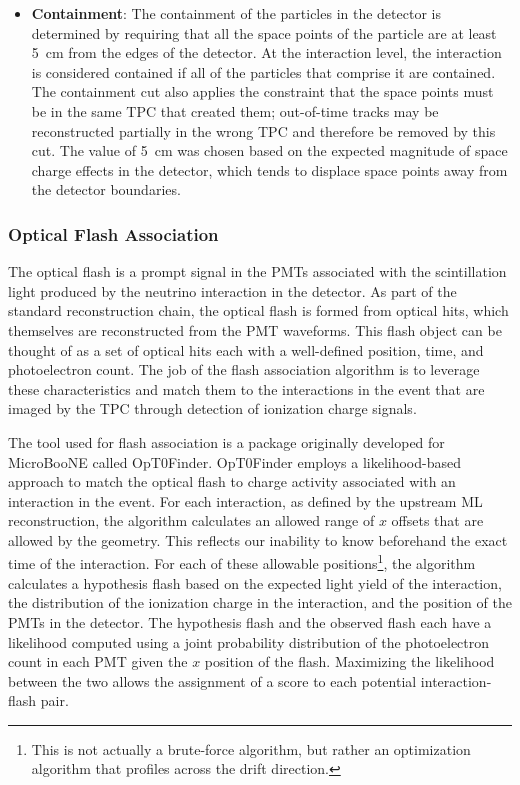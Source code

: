 \begin{itemize}
    \item \textbf{Containment}: The containment of the particles in the detector is determined by requiring that all the space points of the particle are at least \qty[mode=text]{5}{cm} from the edges of the detector. At the interaction level, the interaction is considered contained if all of the particles that comprise it are contained. The containment cut also applies the constraint that the space points must be in the same TPC that created them; out-of-time tracks may be reconstructed partially in the wrong TPC and therefore be removed by this cut. The value of \qty[mode=text]{5}{cm} was chosen based on the expected magnitude of space charge effects in the detector, which tends to displace space points away from the detector boundaries.
\end{itemize}

\subsubsection{Optical Flash Association}
\label{sec:optical_flash_association}

The optical flash is a prompt signal in the PMTs associated with the scintillation light produced by the neutrino interaction in the detector. As part of the standard reconstruction chain, the optical flash is formed from optical hits, which themselves are reconstructed from the PMT waveforms. This flash object can be thought of as a set of optical hits each with a well-defined position, time, and photoelectron count. The job of the flash association algorithm is to leverage these characteristics and match them to the interactions in the event that are imaged by the TPC through detection of ionization charge signals.

The tool used for flash association is a package originally developed for MicroBooNE called OpT0Finder. OpT0Finder employs a likelihood-based approach to match the optical flash to charge activity associated with an interaction in the event. For each interaction, as defined by the upstream ML reconstruction, the algorithm calculates an allowed range of $x$ offsets that are allowed by the geometry. This reflects our inability to know beforehand the exact time of the interaction. For each of these allowable positions\footnote{This is not actually a brute-force algorithm, but rather an optimization algorithm that profiles across the drift direction.}, the algorithm calculates a hypothesis flash based on the expected light yield of the interaction, the distribution of the ionization charge in the interaction, and the position of the PMTs in the detector. The hypothesis flash and the observed flash each have a likelihood computed using a joint probability distribution of the photoelectron count in each PMT given the $x$ position of the flash. Maximizing the likelihood between the two allows the assignment of a score to each potential interaction-flash pair. 

